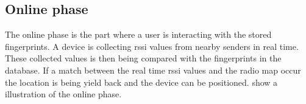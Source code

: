 \subsection{Online phase}\label{sec:theoryFingerprintOnline} The online phase
is the part where a user is interacting with the stored fingerprints.
A device is collecting \acrshort{rssi} values from nearby senders in real time.
These collected values is then being compared with the fingerprints in the database.
If a match between the real time \acrshort{rssi} values and the radio map occur the location is being yield back and the device can be positioned.
 show a illustration of the
online phase.
\cite{IndoorFingerprintPositioning2017}


